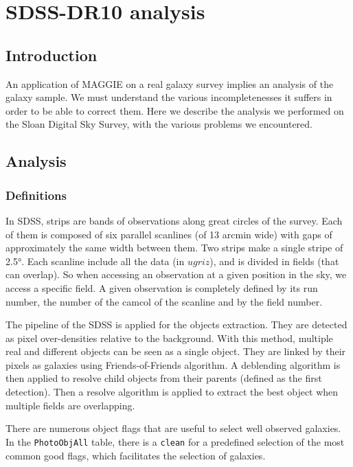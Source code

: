 \chapter{SDSS-DR10 analysis}
\label{cha:sdss}
\minitoc%

\section{Introduction}

An application of MAGGIE on a real galaxy survey implies an analysis of the
galaxy sample. We must understand the various incompletenesses it suffers in
order to be able to correct them. Here we describe the analysis we performed on
the Sloan Digital Sky Survey, with the various problems we encountered.

\section{Analysis}

\subsection{Definitions}

In SDSS, strips are bands of observations along great circles of the survey.
Each of them is composed of six parallel scanlines (of 13 arcmin wide) with
gaps of approximately the same width between them. Two strips make a single
stripe of 2.5°. Each scanline include all the data (in $ugriz$), and is divided
in fields (that can overlap). So when accessing an observation at a given
position in the sky, we access a specific field. A given observation is
completely defined by its run number, the number of the camcol of the scanline
and by the field number.

The pipeline of the SDSS is applied for the objects extraction. They are
detected as pixel over-densities relative to the background. With this method,
multiple real and different objects can be seen as a single object. They are
linked by their pixels as galaxies using Friends-of-Friends algorithm. A
deblending algorithm is then applied to resolve child objects from their
parents (defined as the first detection). Then a resolve algorithm is applied
to extract the best object when multiple fields are overlapping.

There are numerous object flags that are useful to select well observed
galaxies. In the \texttt{PhotoObjAll} table, there is a \texttt{clean} for a
predefined selection of the most common good flags, which facilitates the
selection of galaxies.

